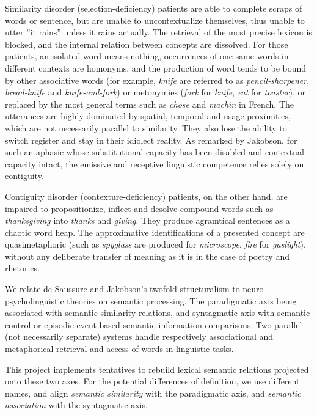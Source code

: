 Similarity disorder (selection-deficiency) patients are able to complete scraps of words or sentence, but are unable to uncontextualize themselves, thus unable to utter ''it rains'' unless it rains actually. The retrieval of the most precise lexicon is blocked, and the internal relation between concepts are dissolved. For those patients, an isolated word means nothing, occurrences of one same words in different contexts are homonyms, and the production of word tends to be bound by other associative words (for example, \emph{knife} are referred to as \emph{pencil-sharpener}, \emph{bread-knife} and \emph{knife-and-fork}) or metonymies (\emph{fork} for \emph{knife}, \emph{eat} for \emph{toaster}), or replaced by the most general terms such as \emph{chose} and \emph{machin} in French. The utterances are highly dominated by spatial, temporal and usage proximities, which are not necessarily parallel to similarity. They also lose the ability to switch register and stay in their idiolect reality. As remarked by Jakobson, for such an aphasic whose substitutional capacity has been disabled and contextual capacity intact, the emissive and receptive linguistic competence relies solely on contiguity. 

Contiguity disorder (contexture-deficiency) patients, on the other hand, are impaired to propositionize, inflect and desolve compound words such as \emph{thanksgiving} into \emph{thanks} and \emph{giving}. They produce agramtical sentences as a chaotic word heap. The approximative identifications of a presented concept are quasimetaphoric (such as \emph{spyglass} are produced for \emph{microscope}, \emph{fire} for \emph{gaslight}), without any deliberate transfer of meaning as it is in the case of poetry and rhetorics. 

We relate de Saussure and Jakobson's twofold structuralism to neuro-psycholinguistic theories on semantic processing. The paradigmatic axis being associated with semantic similarity relations, and syntagmatic axis with semantic control or episodic-event based semantic information comparisons. Two parallel (not necessarily separate) systems handle respectively associational and metaphorical retrieval and access of words in linguistic tasks.

This project implements tentatives to rebuild lexical semantic relations projected onto these two axes. For the potential differences of definition, we use different names, and align \emph{semantic similarity} with the paradigmatic axis, and \emph{semantic association} with the syntagmatic axis.

